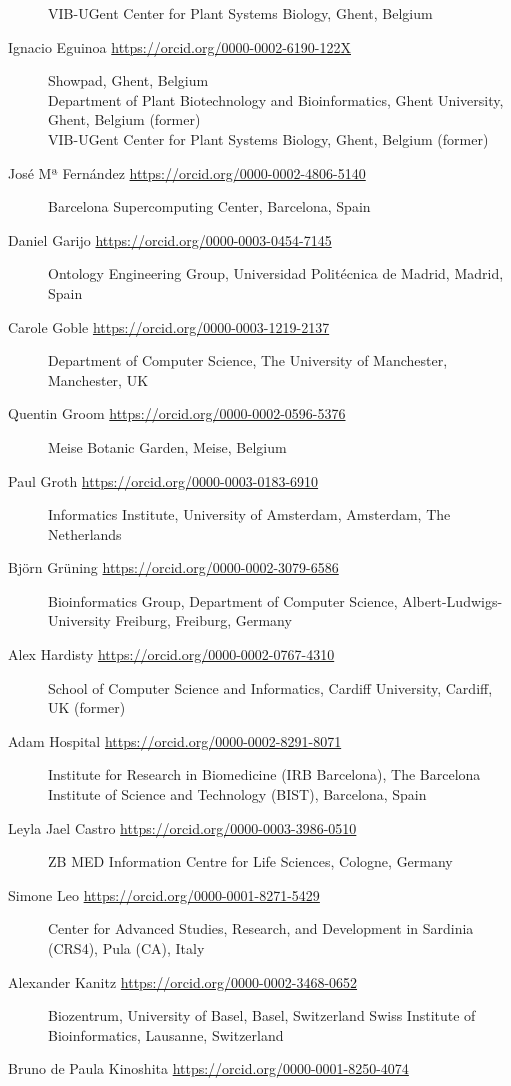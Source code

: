 \begin{flushleft}
\begin{description}
VIB-UGent Center for Plant Systems Biology, Ghent, Belgium
\item[Ignacio Eguinoa \url{https://orcid.org/0000-0002-6190-122X}]
Showpad, Ghent, Belgium\\
Department of Plant Biotechnology and Bioinformatics, Ghent University,
Ghent, Belgium (former)\\
VIB-UGent Center for Plant Systems Biology, Ghent, Belgium (former)
\item[José Mª Fernández \url{https://orcid.org/0000-0002-4806-5140}]
Barcelona Supercomputing Center, Barcelona, Spain
\item[Daniel Garijo \url{https://orcid.org/0000-0003-0454-7145}]
Ontology Engineering Group, Universidad Politécnica de Madrid, Madrid,
Spain
\item[Carole Goble \url{https://orcid.org/0000-0003-1219-2137}]
Department of Computer Science, The University of Manchester,
Manchester, UK
\item[Quentin Groom \url{https://orcid.org/0000-0002-0596-5376}]
Meise Botanic Garden, Meise, Belgium
\item[Paul Groth \url{https://orcid.org/0000-0003-0183-6910}]
Informatics Institute, University of Amsterdam, Amsterdam, The
Netherlands
\item[Björn Grüning \url{https://orcid.org/0000-0002-3079-6586}]
Bioinformatics Group, Department of Computer Science,
Albert-Ludwigs-University Freiburg, Freiburg, Germany
\item[Alex Hardisty \url{https://orcid.org/0000-0002-0767-4310}]
School of Computer Science and Informatics, Cardiff University, Cardiff,
UK (former)
\item[Adam Hospital \url{https://orcid.org/0000-0002-8291-8071}]
Institute for Research in Biomedicine (IRB Barcelona), The Barcelona
Institute of Science and Technology (BIST), Barcelona, Spain
\item[Leyla Jael Castro \url{https://orcid.org/0000-0003-3986-0510}]
ZB MED Information Centre for Life Sciences, Cologne, Germany
\item[Simone Leo \url{https://orcid.org/0000-0001-8271-5429}]
Center for Advanced Studies, Research, and Development in Sardinia
(CRS4), Pula (CA), Italy
\item[Alexander Kanitz \url{https://orcid.org/0000-0002-3468-0652}] 
Biozentrum, University of Basel, Basel, Switzerland
Swiss Institute of Bioinformatics, Lausanne, Switzerland
\item[Bruno de Paula Kinoshita \url{https://orcid.org/0000-0001-8250-4074}]

\end{description}
\end{flushleft}
